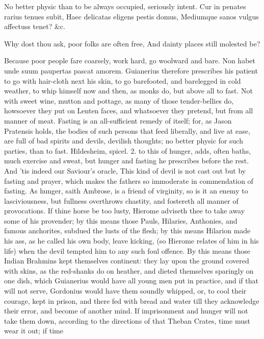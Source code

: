 {No better physic than to be always occupied, seriously intent.
Cur in penates rarius tenues subit,
Haec delicatas eligens pestis domus,
Mediumque sanos vulgus affectuss tenet? \&c.

Why dost thou ask, poor folks are often free,
And dainty places still molested be?

Because poor people fare coarsely, work hard, go woolward and bare.
 Non habet unde suum paupertas pascat amorem. Guianerius
therefore prescribes his patient to go with hair-cloth next his skin,
to go barefooted, and barelegged in cold weather, to whip himself now
and then, as monks do, but above all to fast. Not with sweet wine,
mutton and pottage, as many of those tender-bellies do, howsoever they
put on Lenten faces, and whatsoever they pretend, but from all manner
of meat. Fasting is an all-sufficient remedy of itself; for, as Jason
Pratensis holds, the bodies of such persons that feed liberally, and
live at ease, are full of bad spirits and devils, devilish
thoughts; no better physic for such parties, than to fast. Hildesheim,
spicel. 2. to this of hunger, adds, often baths, much exercise
and sweat, but hunger and fasting he prescribes before the rest. And
'tis indeed our Saviour's oracle, This kind of devil is not cast out
but by fasting and prayer, which makes the fathers so immoderate in
commendation of fasting. As hunger, saith  Ambrose, is a friend
of virginity, so is it an enemy to lasciviousness, but fullness
overthrows chastity, and fostereth all manner of provocations. If thine
horse be too lusty, Hierome adviseth thee to take away some of his
provender; by this means those Pauls, Hilaries, Anthonies, and famous
anchorites, subdued the lusts of the flesh; by this means Hilarion made
his ass, as he called his own body, leave kicking, (so Hierome
relates of him in his life) when the devil tempted him to any such foul
offence. By this means those Indian Brahmins kept themselves
continent: they lay upon the ground covered with skins, as the
red-shanks do on heather, and dieted themselves sparingly on one dish,
which Guianerius would have all young men put in practice, and if that
will not serve, Gordonius would have them soundly whipped, or, to
cool their courage, kept in prison, and there fed with bread and water
till they acknowledge their error, and become of another mind. If
imprisonment and hunger will not take them down, according to the
directions of that  Theban Crates, time must wear it out; if time
}
